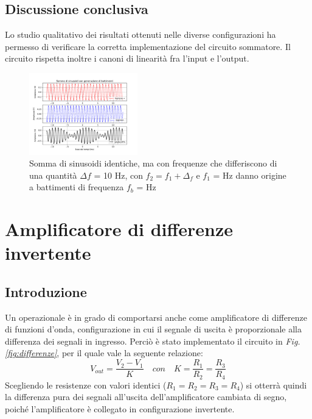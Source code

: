 \documentclass[journal]{IEEEtran}
\begin{document}
\subsection{\textbf{Discussione conclusiva}}
Lo studio qualitativo dei risultati ottenuti nelle diverse configurazioni ha permesso di verificare la corretta implementazione del circuito sommatore. Il circuito rispetta inoltre i canoni di linearità fra l'input e l'output. 

\begin{figure}[H]%
\begin {center}
\includegraphics[width=0.42\textwidth]{analysis/output/OPA_mixer_beats.pdf}
\caption{Somma di sinusoidi identiche, ma con frequenze che differiscono di una quantità $\Delta f$ = 10 Hz, con $f_2 = f_1 + \Delta_f$ e $f_1$ = Hz  danno origine a battimenti di frequenza $f_b$ = Hz}
\label{fig:beats}
\end {center}
\end{figure}


\section{\textbf{Amplificatore di differenze invertente \label{par:differenze}}} %
\subsection{\textbf{Introduzione}}
Un operazionale è in grado di comportarsi anche come amplificatore di differenze di funzioni d'onda, configurazione in cui il segnale di uscita è proporzionale alla differenza dei segnali in ingresso. Perciò è stato implementato il circuito in \textit{Fig.  \ref{fig:differenze}}, per il quale vale la seguente relazione: 
\[V_{out} =\frac{V_2 - V_1}{K} \quad con \quad K = \frac{R_1}{R_2}=\frac{R_3}{R_4} \tag{2} \] 
Scegliendo le resistenze con valori identici ($R_1 = R_2 = R_3 =R_4 $) si otterrà quindi la differenza pura dei segnali all'uscita dell'amplificatore cambiata di segno, poiché l'amplificatore è collegato in configurazione invertente.
\end{document}
